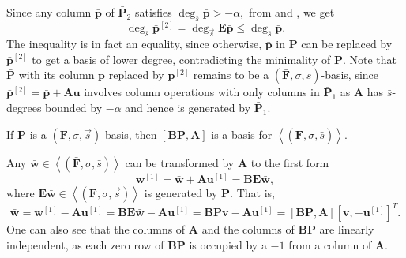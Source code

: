 \begin{pf}
Since any column $\bar{\mathbf{p}}$ of $\bar{\mathbf{P}}_{2}$ satisfies
$\deg_{\bar{s}}\bar{\mathbf{p}}>-\alpha,$ from 
and , we get \[
\deg_{\bar{s}}\bar{\mathbf{p}}^{[2]}=\deg_{\vec{s}}\mathbf{E}\bar{\mathbf{p}}\le\deg_{\bar{s}}\bar{\mathbf{p}}.\]
 The inequality is in fact an equality, since otherwise, $\bar{\mathbf{p}}$
in $\bar{\mathbf{P}}$ can be replaced by $\bar{\mathbf{p}}^{[2]}$
to get a basis of lower degree, contradicting the minimality of $\bar{\mathbf{P}}$.
Note that $\bar{\mathbf{P}}$ with its column $\bar{\mathbf{p}}$
replaced by $\bar{\mathbf{p}}^{[2]}$ remains to be a $\left(\bar{\mathbf{F}},\sigma,\bar{s}\right)$-basis,
since $\bar{\mathbf{p}}^{[2]}=\bar{\mathbf{p}}+\mathbf{A}\mathbf{u}$
involves column operations with only columns in $\bar{\mathbf{P}}_{1}$
as $\mathbf{A}$ has $\bar{s}$-degrees bounded by $-\alpha$ and
hence is generated by $\bar{\mathbf{P}}_{1}$.\end{pf}
\begin{lem}
\label{lem:PtoBPA}If $\mathbf{P}$ is a $\left(\mathbf{F},\sigma,\vec{s}\right)$-basis,
then $\left[\mathbf{B}\mathbf{P},\mathbf{A}\right]$ is a basis for
$\left\langle \left(\bar{\mathbf{F}},\sigma,\bar{s}\right)\right\rangle $.\end{lem}
\begin{pf}
Any $\bar{\mathbf{w}}\in\left\langle \left(\bar{\mathbf{F}},\sigma,\bar{s}\right)\right\rangle $
can be transformed by $\mathbf{A}$ to the first form \[
\mathbf{w}^{[1]}=\bar{\mathbf{w}}+\mathbf{A}\mathbf{u}^{[1]}=\mathbf{B}\mathbf{E}\bar{\mathbf{w}},\]
 where $\mathbf{E}\bar{\mathbf{w}}\in\left\langle \left(\mathbf{F},\sigma,\vec{s}\right)\right\rangle $
is generated by $\mathbf{P}$. That is, \[
\bar{\mathbf{w}}=\mathbf{w}^{[1]}-\mathbf{A}\mathbf{u}^{[1]}=\mathbf{B}\mathbf{E}\bar{\mathbf{w}}-\mathbf{A}\mathbf{u}^{[1]}=\mathbf{B}\mathbf{P}\mathbf{v}-\mathbf{A}\mathbf{u}^{[1]}=\left[\mathbf{B}\mathbf{P},\mathbf{A}\right][\mathbf{v},-\mathbf{u}^{[1]}]^{T}.\]
 One can also see that the columns of $\mathbf{A}$ and the columns
of $\mathbf{B}\mathbf{P}$ are linearly independent, as each zero
row of $\mathbf{B}\mathbf{P}$ is occupied by a $-1$ from a column
of $\mathbf{A}$. 
\end{pf}
%

